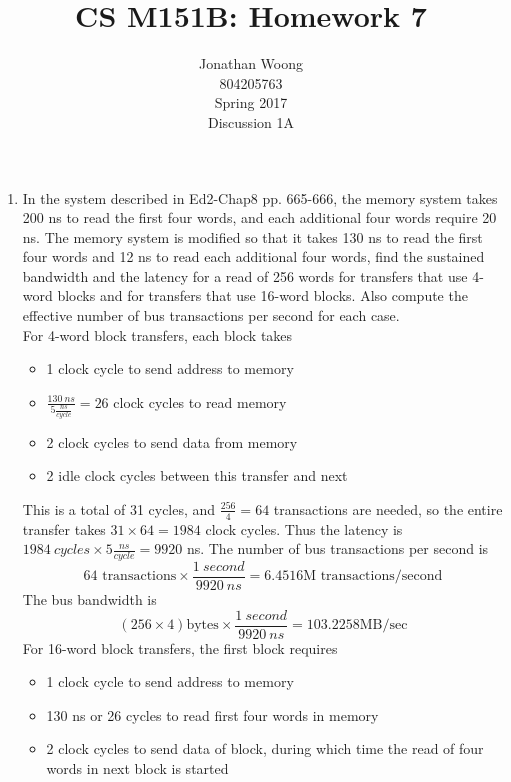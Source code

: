 \documentclass[10pt,letterpaper]{article}
\date{\displaydate{date}}
\begin{document}
\title{CS M151B: Homework 7}
\author{
	Jonathan Woong\\
	804205763\\
	Spring 2017\\
	Discussion 1A}
\maketitle
\pagebreak


\begin{enumerate}[label=\textbf{Problem \arabic*.}]
\item In the system described in Ed2-Chap8 pp. 665-666, the memory system takes 200 ns to read the first four words, and each additional four words require 20 ns. The memory system is modified so that it takes 130 ns to read the first four words and 12 ns to read each additional four words, find the sustained bandwidth and the latency for a read of 256 words for transfers that use 4-word blocks and for transfers that use 16-word blocks. Also compute the effective number of bus transactions per second for each case.\\
For 4-word block transfers, each block takes
	\begin{itemize}
	\item 1 clock cycle to send address to memory
	\item $\frac{130 \ ns}{5\frac{ns}{cycle}} = 26$ clock cycles to read memory 
	\item 2 clock cycles to send data from memory
	\item 2 idle clock cycles between this transfer and next
	\end{itemize}
This is a total of 31 cycles, and $\frac{256}{4}=64$ transactions are needed, so the entire transfer takes $31\times64=1984$ clock cycles. Thus the latency is $1984 \ cycles \times 5\frac{ns}{cycle} = 9920$ ns. The number of bus transactions per second is 
\[\boxed{64 \text{ transactions} \times \frac{1 \ second}{9920 \ ns} = 6.4516 \text{M transactions/second}}\]
The bus bandwidth is 
\[\boxed{(256 \times 4) \text{bytes} \times \frac{1 \ second}{9920 \ ns} = 103.2258 \text{MB/sec}}\]
For 16-word block transfers, the first block requires
	\begin{itemize}
	\item 1 clock cycle to send address to memory
	\item 130 ns or 26 cycles to read first four words in memory 
	\item 2 clock cycles to send data of block, during which time the read of four words in next block is started

\end{itemize}
\end{enumerate}
\end{document}
